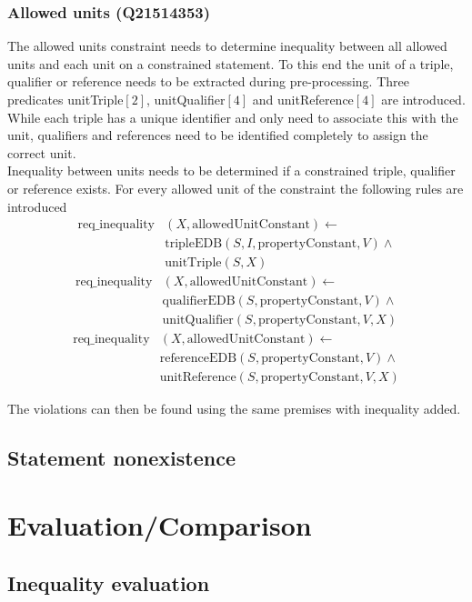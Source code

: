 \documentclass[hyperref,bachelorofscience,fleqn]{cgvpub}
\begin{document}
\subsection{Allowed units (Q21514353)}
The allowed units constraint needs to determine inequality between all allowed units and each unit on a constrained statement. To this end the unit of a triple, qualifier or reference needs to be extracted during pre-processing. Three predicates unitTriple\([2]\), unitQualifier\([4]\) and unitReference\([4]\) are introduced. While each triple has a unique identifier and only need to associate this with the unit, qualifiers and references need to be identified completely to assign the correct unit.\\

Inequality between units needs to be determined if a constrained triple, qualifier or reference exists. For every allowed unit of the constraint the following rules are introduced
\begin{equation*}
\begin{split}
\text{req\_inequality}&(X, \text{allowedUnitConstant}) \leftarrow \\
&\text{tripleEDB}(S, I, \text{propertyConstant}, V) \wedge \\
&\text{unitTriple}(S, X)
\end{split}
\end{equation*}
\begin{equation*}
\begin{split}
\text{req\_inequality}&(X, \text{allowedUnitConstant}) \leftarrow \\
&\text{qualifierEDB}(S, \text{propertyConstant}, V) \wedge \\
&\text{unitQualifier}(S, \text{propertyConstant}, V, X)
\end{split}
\end{equation*}
\begin{equation*}
\begin{split}
\text{req\_inequality}&(X, \text{allowedUnitConstant}) \leftarrow \\
&\text{referenceEDB}(S, \text{propertyConstant}, V) \wedge \\
&\text{unitReference}(S, \text{propertyConstant}, V, X)
\end{split}
\end{equation*}

The violations can then be found using the same premises with inequality added.

\section{Statement nonexistence}\label{sec_statement_nonexistence}


\chapter{Evaluation/Comparison}

\section{Inequality evaluation}\label{sec_inequality_evaluation}
\end{document}
